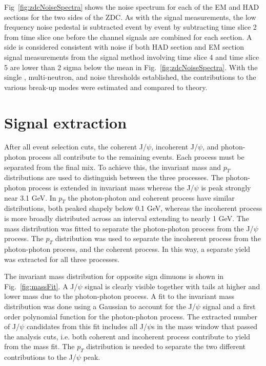       Fig~\ref{fig:zdcNoiseSpectra} shows the noise spectrum for each of the 
        EM and HAD sections for the two sides of the ZDC. 
      As with the signal measurements, the low frequency noise pedestal is 
        subtracted event by event by subtracting time slice 2 from time slice
        one before the channel signals are combined for each section.
      A side is considered consistent with noise if both HAD section and EM 
        section signal measurements from the signal method involving time slice
        4 and time slice 5 are lower than 2 sigma below the mean in 
        Fig.~\ref{fig:zdcNoiseSpectra}.
      With the single \DIFdelbegin {}\DIFdelend \DIFaddbegin {}\DIFaddend , multi-neutron, and noise thresholds established,
        the contributions to the various break-up modes were estimated and 
        compared to theory. 


  \section{\label{sec:sigEx} Signal extraction}
    After all event selection cuts, the coherent J/$\psi$, incoherent J/$\psi$,
      and photon-photon process all contribute to the remaining events.
    Each process must be separated from the final mix.
    To achieve this, the invariant mass and $p_{T}$ distributions are used 
      to distinguish between the three processes. 
    The photon-photon process is extended in invariant mass whereas the 
      J/$\psi$ is peak strongly near 3.1 GeV.
    In $p_{T}$ the photon-photon and coherent process have similar 
      distributions, both peaked shapely below 0.1 GeV, whereas the incoherent 
      process is more broadly distributed across an interval extending to 
      nearly 1 GeV.
    The mass distribution was fitted to separate the photon-photon process from
      the J/$\psi$ process.
    The $p_{T}$ distribution was used to separate the incoherent process from 
      the photon-photon process, and the coherent process. 
    In this way, a separate yield was extracted for all three processes. 

    The invariant mass distribution for opposite sign dimuons is shown in 
      Fig.~\ref{fig:massFit}. 
    A J/$\psi$ signal is clearly visible together with tails at higher and
      \DIFdelbegin {}\DIFdelend lower mass due to the photon-photon process.
    A fit to the invariant mass distribution was done using a Gaussian
      to account for the J/$\psi$ signal and a first order polynomial function 
      for the photon-photon process.
    The extracted number of J/$\psi$ candidates from this fit includes all 
      J/$\psi$s in the mass window that passed the analysis cuts, i.e. both
      coherent and incoherent process contribute to yield from the mass
      fit.
    The $p_{T}$ distribution is needed to separate the two different 
      contributions to the J/$\psi$ peak. 

